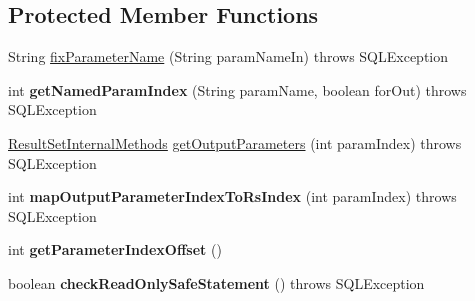 \subsection*{Protected Member Functions}
\begin{DoxyCompactItemize}
\item 
String \mbox{\hyperlink{classcom_1_1mysql_1_1jdbc_1_1_callable_statement_a1986bfd17dcbabcad4efff9b897fab15}{fix\+Parameter\+Name}} (String param\+Name\+In)  throws S\+Q\+L\+Exception 
\item 
\mbox{\label{classcom_1_1mysql_1_1jdbc_1_1_callable_statement_a3b38a94ee9ab97737edb699a13ad5b38}} 
int {\bfseries get\+Named\+Param\+Index} (String param\+Name, boolean for\+Out)  throws S\+Q\+L\+Exception 
\item 
\mbox{\hyperlink{interfacecom_1_1mysql_1_1jdbc_1_1_result_set_internal_methods}{Result\+Set\+Internal\+Methods}} \mbox{\hyperlink{classcom_1_1mysql_1_1jdbc_1_1_callable_statement_a1182e743ef39610d0aaa8cda05648433}{get\+Output\+Parameters}} (int param\+Index)  throws S\+Q\+L\+Exception 
\item 
\mbox{\label{classcom_1_1mysql_1_1jdbc_1_1_callable_statement_a029b9696ee1a38bea59a16ae22736e8d}} 
int {\bfseries map\+Output\+Parameter\+Index\+To\+Rs\+Index} (int param\+Index)  throws S\+Q\+L\+Exception 
\item 
\mbox{\label{classcom_1_1mysql_1_1jdbc_1_1_callable_statement_adcb29e8a5214037aee2797d4a4c9ed01}} 
int {\bfseries get\+Parameter\+Index\+Offset} ()
\item 
\mbox{\label{classcom_1_1mysql_1_1jdbc_1_1_callable_statement_a0138cd92f5ffc574d9918969aba7026a}} 
boolean {\bfseries check\+Read\+Only\+Safe\+Statement} ()  throws S\+Q\+L\+Exception 
\end{DoxyCompactItemize}

